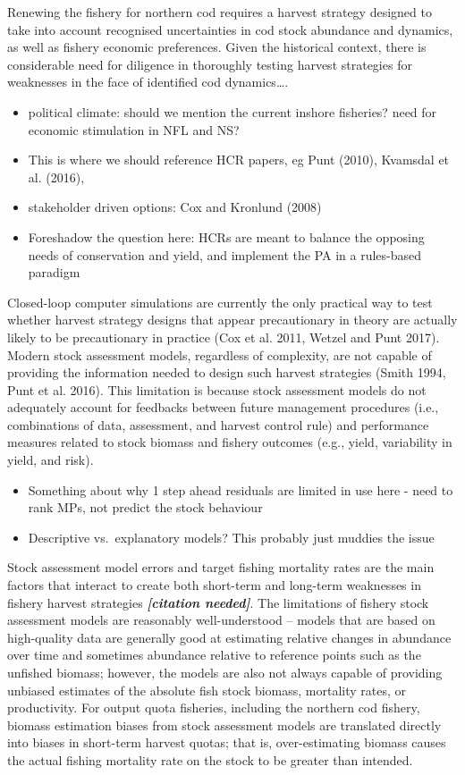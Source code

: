 \documentclass[12pt,]{article}
\providecommand{\tightlist}{%
  \setlength{\itemsep}{0pt}\setlength{\parskip}{0pt}}
\begin{document}
Renewing the fishery for northern cod requires a harvest strategy
designed to take into account recognised uncertainties in cod stock
abundance and dynamics, as well as fishery economic preferences. Given
the historical context, there is considerable need for diligence in
thoroughly testing harvest strategies for weaknesses in the face of
identified cod dynamics\ldots{}.

\begin{itemize}
\tightlist
\item
  political climate: should we mention the current inshore fisheries?
  need for economic stimulation in NFL and NS?
\item
  This is where we should reference HCR papers, eg Punt (2010), Kvamsdal
  et al. (2016),
\item
  stakeholder driven options: Cox and Kronlund (2008)
\item
  Foreshadow the question here: HCRs are meant to balance the opposing
  needs of conservation and yield, and implement the PA in a rules-based
  paradigm
\end{itemize}

Closed-loop computer simulations are currently the only practical way to
test whether harvest strategy designs that appear precautionary in
theory are actually likely to be precautionary in practice (Cox et al.
2011, Wetzel and Punt 2017). Modern stock assessment models, regardless
of complexity, are not capable of providing the information needed to
design such harvest strategies (Smith 1994, Punt et al. 2016). This
limitation is because stock assessment models do not adequately account
for feedbacks between future management procedures (i.e., combinations
of data, assessment, and harvest control rule) and performance measures
related to stock biomass and fishery outcomes (e.g., yield, variability
in yield, and risk).

\begin{itemize}
\tightlist
\item
  Something about why 1 step ahead residuals are limited in use here -
  need to rank MPs, not predict the stock behaviour
\item
  Descriptive vs.~explanatory models? This probably just muddies the
  issue
\end{itemize}

Stock assessment model errors and target fishing mortality rates are the
main factors that interact to create both short-term and long-term
weaknesses in fishery harvest strategies \textbf{\emph{{[}citation
needed{]}}}. The limitations of fishery stock assessment models are
reasonably well-understood -- models that are based on high-quality data
are generally good at estimating relative changes in abundance over time
and sometimes abundance relative to reference points such as the
unfished biomass; however, the models are also not always capable of
providing unbiased estimates of the absolute fish stock biomass,
mortality rates, or productivity. For output quota fisheries, including
the northern cod fishery, biomass estimation biases from stock
assessment models are translated directly into biases in short-term
harvest quotas; that is, over-estimating biomass causes the actual
fishing mortality rate on the stock to be greater than intended.
\end{document}
